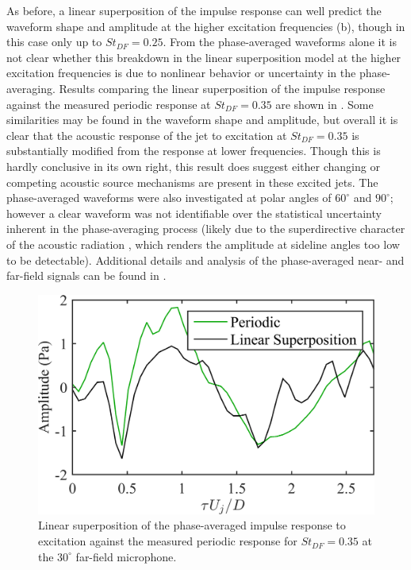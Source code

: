 As before, a linear superposition of the impulse response can well predict the waveform shape and amplitude at the higher excitation frequencies (b), though in this case only up to $St_{DF}  = 0.25$. 
From the phase-averaged waveforms alone it is not clear whether this breakdown in the linear superposition model at the higher excitation frequencies is due to nonlinear behavior or uncertainty in the phase-averaging. 
Results comparing the linear superposition of the impulse response against the measured periodic response at $St_{DF}  = 0.35$ are shown in .
Some similarities may be found in the waveform shape and amplitude, but overall it is clear that the acoustic response of the jet to excitation at $St_{DF}  = 0.35$ is substantially modified from the response at lower frequencies.
Though this is hardly conclusive in its own right, this result does suggest either changing or competing acoustic source mechanisms are present in these excited jets.
The phase-averaged waveforms were also investigated at polar angles of $60^\circ$ and $90^\circ$; however a clear waveform was not identifiable over the statistical uncertainty inherent in the phase-averaging process (likely due to the superdirective character of the acoustic radiation \citep{Crighton1990}, which renders the amplitude at sideline angles too low to be detectable).
Additional details and analysis of the phase-averaged near- and far-field signals can be found in \citet{Crawley2015}.
\begin{figure}
	\centering
	\includegraphics[width=0.45\linewidth]{Figures/ch3_farfield_linearsuperposition_st035_v2.png}
	\caption{Linear superposition of the phase-averaged impulse response to excitation against the measured periodic response for $St_{DF} = 0.35$ at the  $30^\circ$ far-field microphone.}
	\label{fig:ch3_farfield_nonlinear}
\end{figure}

